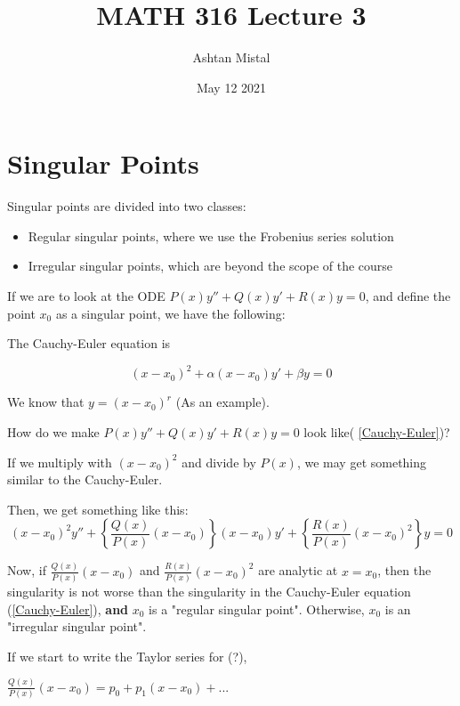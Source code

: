 \documentclass{article}
\title{MATH 316 Lecture 3}
\author{Ashtan Mistal}
\date{May 12 2021}
\begin{document}
\ifstandalone
\maketitle
\fi

\graphicspath{{./Lecture03/}}

\section{Singular Points}

Singular points are divided into two classes:

\begin{itemize}
    \item Regular singular points, where we use the Frobenius series solution
    \item Irregular singular points, which are beyond the scope of the course
\end{itemize}

If we are to look at the ODE $P(x) y'' + Q(x) y' + R(x) y = 0$, and define the point $x_0$ as a singular point, we have the following:

The Cauchy-Euler equation is 

\begin{equation}
\label{Cauchy-Euler}
    (x - x_0)^2 + \alpha (x - x_0) y' + \beta y = 0
\end{equation}

We know that $y = (x - x_0)^r$ (As an example). 

How do we make $P(x) y'' + Q(x) y' + R(x) y = 0$ look like( \ref{Cauchy-Euler})?

If we multiply with $(x - x_0)^2$ and divide by $P(x)$, we may get something similar to the Cauchy-Euler. 

Then, we get something like this:
\begin{equation}
    (x - x_0)^2 y'' + \left\{ \frac{Q(x)}{P(x)} (x - x_0) \right\} (x - x_0) y' + \left\{ \frac{R(x)}{P(x)} (x - x_0)^2 \right\} y = 0
\end{equation}


Now, if $\frac{Q(x)}{P(x)}(x - x_0)$ and $\frac{R(x)}{P(x)} (x - x_0)^2$ are analytic at $x = x_0$, then the singularity is not worse than the singularity in the Cauchy-Euler equation (\ref{Cauchy-Euler}), \textbf{and} $x_0$ is a "regular singular point". Otherwise, $x_0$ is an "irregular singular point". 

If we start to write the Taylor series for (?),

$\frac{Q(x)}{P(x)} (x - x_0) = p_0 + p_1 (x - x_0) + ...$
\end{document}
